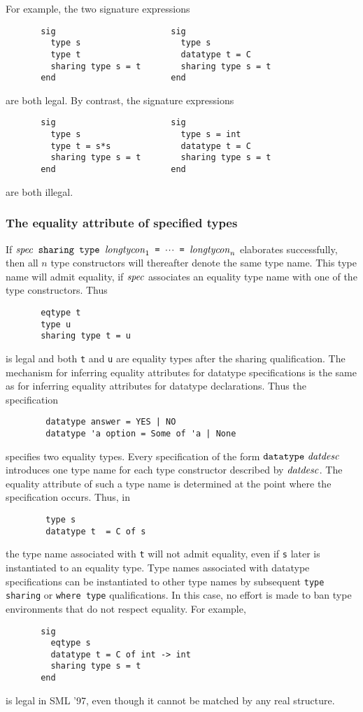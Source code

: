 For example, the two signature expressions
\begin{verbatim}
       sig                       sig 
         type s                    type s
         type t                    datatype t = C
         sharing type s = t        sharing type s = t
       end                       end
\end{verbatim}
are both legal. By contrast,  the signature expressions
\begin{verbatim}
       sig                       sig 
         type s                    type s = int
         type t = s*s              datatype t = C
         sharing type s = t        sharing type s = t
       end                       end
\end{verbatim}
are both illegal. 
\bigskip

\subsubsection{The equality attribute of specified types} 
If $\hbox{\tt ${\it spec}$ sharing type ${\it longtycon}_1$ = $\mbox{$\cdot\!\cdot\!\cdot$}$ = ${\it longtycon}_n$}$ elaborates successfully, then all $n$ type constructors
will thereafter denote the same type name. 
This type name will admit equality, if ${\it spec}$ associates an equality
type name with one of the type constructors.
Thus
\begin{verbatim}
       eqtype t
       type u 
       sharing type t = u
\end{verbatim}
is legal and both {\tt t} and {\tt u} are equality types after the sharing
qualification.
The mechanism for inferring equality attributes for datatype specifications
is the same as for inferring equality attributes for datatype declarations.
Thus the specification
\begin{verbatim}
        datatype answer = YES | NO
        datatype 'a option = Some of 'a | None
\end{verbatim}
specifies two equality types. Every  specification
of the form $\mbox{{\tt datatype}\ {\it datdesc}}$ 
introduces one type name for each type constructor described
by ${\it datdesc}$. The equality attribute of such a  type name is
determined at the point where the specification occurs.
Thus, in
\begin{verbatim}
        type s
        datatype t  = C of s
\end{verbatim}
the type name associated with {\tt t} 
will not admit equality, even if {\tt s} later is
instantiated to an equality type. Type names associated with datatype
specifications can be instantiated to other type names 
by subsequent {\tt type sharing} or {\tt where type}
qualifications. In this case,  no effort is made to 
ban type environments that do not respect equality. For example,
\begin{verbatim}
       sig
         eqtype s
         datatype t = C of int -> int
         sharing type s = t
       end
\end{verbatim}
is legal in SML '97, even though it cannot be matched by any real structure.

